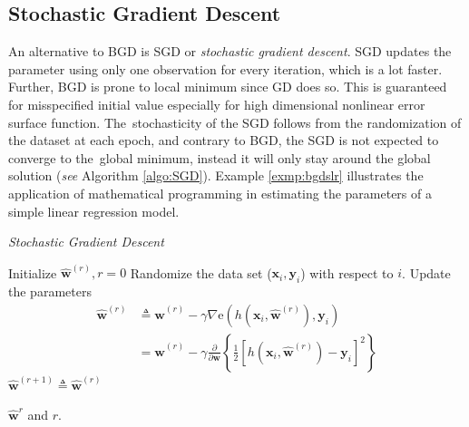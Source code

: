 \subsection{Stochastic Gradient Descent}\label{sec:sgd}
An alternative to BGD is SGD or \textit{stochastic gradient descent}. SGD updates the parameter using only one observation for every iteration, which is a lot faster. Further, BGD is prone to local minimum since GD does so. This is guaranteed for misspecified initial value especially for high dimensional nonlinear error surface function. \mbox{The stochasticity} of the SGD follows from the randomization of the dataset at each epoch, and contrary to BGD, the SGD is not expected to converge to \mbox{the global} minimum, instead it will only stay around the global solution (\textit{see} Algorithm \ref{algo:SGD}). Example \ref{exmp:bgdslr} illustrates the application of mathematical programming in estimating the parameters of a simple linear regression model.
\vspace{.4cm}

\begin{algorithm}[!h]
\caption{\it Stochastic Gradient Descent}
\label{algo:SGD}
\begin{algorithmic}[1]\vspace{.2cm}
\item Initialize $\hat{\mathbf{w}}^{(r)},r=0$\vspace{.2cm}
\vspace{.2cm}
\State Randomize the data set ($\mathbf{x}_i,\mathbf{y}_i$) with respect to $i$.\vspace{.2cm}
\vspace{.2cm}
\State Update the parameters
\begin{align}\nonumber
\hat{\mathbf{w}}^{(r)}&\triangleq \hat{\mathbf{w}}^{(r)} - \gamma\nabla\mathrm{e}(h(\mathbf{x}_i,\hat{\mathbf{w}}^{(r)}),\mathbf{y}_i)\\\nonumber
&=\hat{\mathbf{w}}^{(r)} - \gamma\frac{\partial}{\partial\mathbf{w}}\left\{\frac{1}{2}[h(\mathbf{x}_i,\hat{\mathbf{w}}^{(r)})-\mathbf{y}_i]^2\right\}
\end{align}
\EndFor\vspace{.2cm}
\State $\hat{\mathbf{w}}^{(r+1)}\triangleq \hat{\mathbf{w}}^{(r)}$\vspace{.2cm}
\EndWhile\vspace{.2cm}
\item\Return $\hat{\mathbf{w}}^{r}$ and $r$.
\end{algorithmic}
\end{algorithm}
